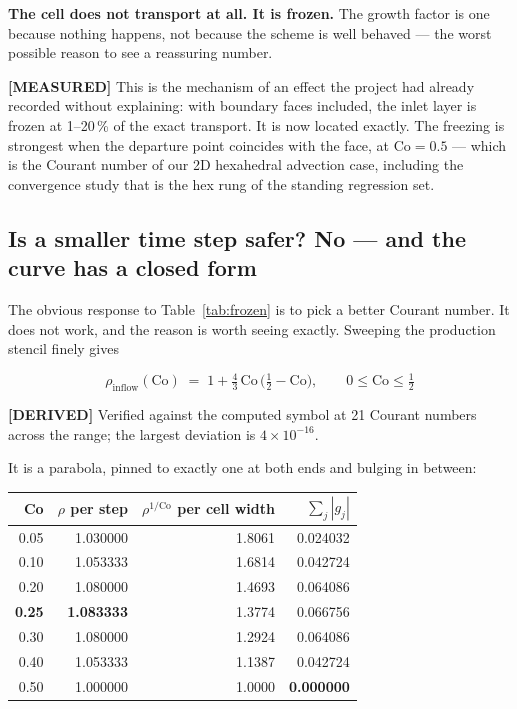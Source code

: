 \documentclass[11pt,a4paper]{article}
\newcommand{\derived}{\textcolor{blue!50!black}{\textbf{[DERIVED]}}}
\newcommand{\measured}{\textcolor{green!35!black}{\textbf{[MEASURED]}}}
\begin{document}
\textbf{The cell does not transport at all. It is frozen.} The growth factor is one because
nothing happens, not because the scheme is well behaved --- the worst possible reason to see a
reassuring number.

\measured{} This is the mechanism of an effect the project had already recorded without
explaining: with boundary faces included, the inlet layer is frozen at 1--20\,\% of the exact
transport. It is now located exactly. The freezing is strongest when the departure point
coincides with the face, at $\mathrm{Co} = 0.5$ --- which is the Courant number of our 2D
hexahedral advection case, including the convergence study that is the hex rung of the standing
regression set.

\subsection{Is a smaller time step safer? No --- and the curve has a closed form}
\label{sec:cochoice}

The obvious response to Table~\ref{tab:frozen} is to pick a better Courant number. It does not
work, and the reason is worth seeing exactly. Sweeping the production stencil finely gives

\begin{equation}
  \boxed{\;\rho_{\text{inflow}}(\mathrm{Co}) \;=\; 1 + \tfrac{4}{3}\,\mathrm{Co}\,
         \bigl(\tfrac12 - \mathrm{Co}\bigr), \qquad 0 \le \mathrm{Co} \le \tfrac12 \;}
  \label{eq:cocurve}
\end{equation}

\derived{} Verified against the computed symbol at 21 Courant numbers across the range; the
largest deviation is $4\times10^{-16}$.

It is a parabola, pinned to exactly one at both ends and bulging in between:

\begin{center}
\begin{tabular}{rrrr}
\toprule
Co & $\rho$ per step & $\rho^{1/\mathrm{Co}}$ per cell width & $\sum_j|g_j|$ \\
\midrule
0.05 & 1.030000 & 1.8061 & 0.024032 \\
0.10 & 1.053333 & 1.6814 & 0.042724 \\
0.20 & 1.080000 & 1.4693 & 0.064086 \\
\textbf{0.25} & \textbf{1.083333} & 1.3774 & 0.066756 \\
0.30 & 1.080000 & 1.2924 & 0.064086 \\
0.40 & 1.053333 & 1.1387 & 0.042724 \\
0.50 & 1.000000 & 1.0000 & \textbf{0.000000} \\
\bottomrule
\end{tabular}
\end{center}
\end{document}
